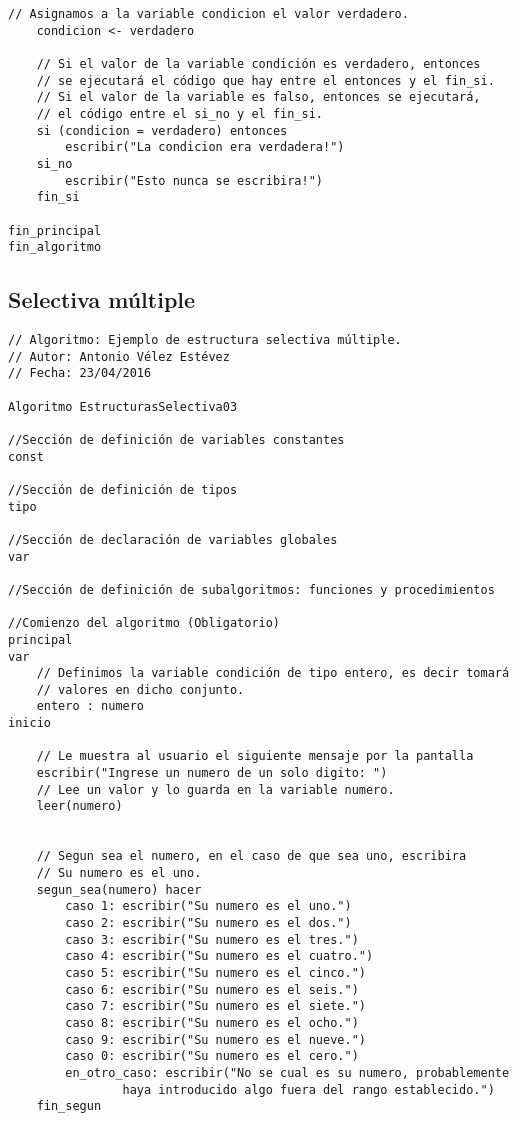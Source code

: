\documentclass{article}
\begin{document}
\begin{appendices}
\begin{lstlisting}[language = pseudocodigoesp]
	// Asignamos a la variable condicion el valor verdadero.
	condicion <- verdadero
	
	// Si el valor de la variable condición es verdadero, entonces
	// se ejecutará el código que hay entre el entonces y el fin_si.
	// Si el valor de la variable es falso, entonces se ejecutará,
	// el código entre el si_no y el fin_si.
	si (condicion = verdadero) entonces
		escribir("La condicion era verdadera!")
	si_no
		escribir("Esto nunca se escribira!")
	fin_si

fin_principal
fin_algoritmo
\end{lstlisting}
\subsection{Selectiva múltiple}
\begin{lstlisting}[language = pseudocodigoesp]
// Algoritmo: Ejemplo de estructura selectiva múltiple.
// Autor: Antonio Vélez Estévez
// Fecha: 23/04/2016
 
Algoritmo EstructurasSelectiva03

//Sección de definición de variables constantes
const 
	
//Sección de definición de tipos
tipo

//Sección de declaración de variables globales	
var

//Sección de definición de subalgoritmos: funciones y procedimientos	

//Comienzo del algoritmo (Obligatorio)
principal	
var
	// Definimos la variable condición de tipo entero, es decir tomará
	// valores en dicho conjunto.
	entero : numero
inicio 	

	// Le muestra al usuario el siguiente mensaje por la pantalla
	escribir("Ingrese un numero de un solo digito: ")
	// Lee un valor y lo guarda en la variable numero.
	leer(numero)
	
	
	// Segun sea el numero, en el caso de que sea uno, escribira
	// Su numero es el uno.
	segun_sea(numero) hacer
		caso 1: escribir("Su numero es el uno.")
		caso 2: escribir("Su numero es el dos.")
		caso 3: escribir("Su numero es el tres.")
		caso 4: escribir("Su numero es el cuatro.")
		caso 5: escribir("Su numero es el cinco.")
		caso 6: escribir("Su numero es el seis.")
		caso 7: escribir("Su numero es el siete.")
		caso 8: escribir("Su numero es el ocho.")
		caso 9: escribir("Su numero es el nueve.")
		caso 0: escribir("Su numero es el cero.")
		en_otro_caso: escribir("No se cual es su numero, probablemente
                haya introducido algo fuera del rango establecido.")
	fin_segun


\end{lstlisting}
\end{appendices}
\end{document}
